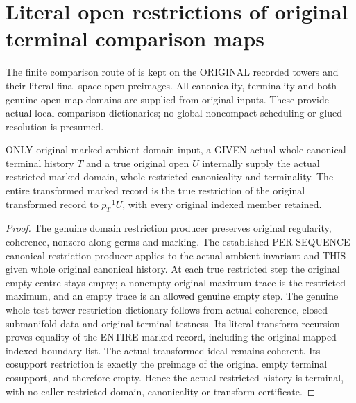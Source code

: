 \section{Literal open restrictions of original terminal comparison maps}

The finite comparison route of
\cite{wlodarczyk05-hironaka,bierstone-milman08-functoriality} is kept on
the ORIGINAL recorded towers and their literal final-space open preimages.
All canonicality, terminality and both genuine open-map domains are supplied
from original inputs. These provide actual local comparison dictionaries;
no global noncompact scheduling or glued resolution is presumed.

\begin{lemma}
\label{hir:original-terminal-open-actual-history-data}
\leanok
ONLY original marked ambient-domain input, a GIVEN actual whole canonical
terminal history $T$ and a true original open $U$ internally supply the
actual restricted marked domain, whole restricted canonicality and
terminality. The entire transformed marked record is the true restriction
of the original transformed record to $p_T^{-1}U$, with every original
indexed member retained.
\end{lemma}
\begin{proof}
The genuine domain restriction producer preserves original regularity,
coherence, nonzero-along germs and marking. The established PER-SEQUENCE
canonical restriction producer applies to the actual ambient invariant
and THIS given whole original canonical history. At each true restricted
step the original empty centre stays empty; a nonempty original maximum
trace is the restricted maximum, and an empty trace is an allowed genuine
empty step. The genuine whole test-tower restriction dictionary follows
from actual coherence, closed submanifold data and original terminal
testness. Its literal transform recursion proves equality of the ENTIRE
marked record, including the original mapped indexed boundary list.
The actual transformed ideal remains coherent. Its cosupport restriction
is exactly the preimage of the original empty terminal cosupport, and
therefore empty. Hence the actual restricted history is terminal, with
no caller restricted-domain, canonicality or transform certificate.
\end{proof}

